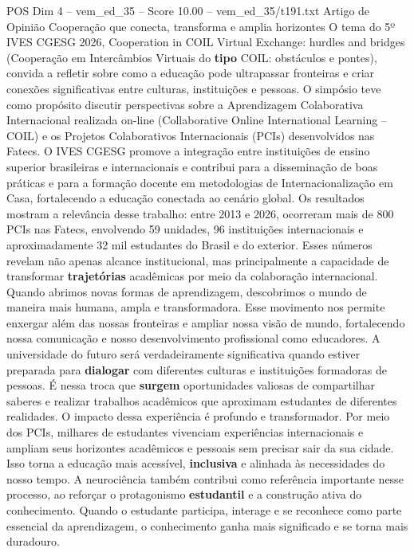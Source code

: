 \begin{textsample}{POS Dim 4 – vem\_ed\_35 – Score 10.00 – vem\_ed\_35/t191.txt}  \label{ex:f4_pos_004}
Artigo de Opinião Cooperação que conecta, transforma e amplia horizontes O tema do 5º IVES CGESG 2026, Cooperation in COIL Virtual Exchange: hurdles and bridges (Cooperação em Intercâmbios Virtuais do \textbf{tipo} COIL: obstáculos e pontes), convida a refletir sobre como a educação pode ultrapassar fronteiras e criar conexões significativas entre culturas, instituições e pessoas.
O simpósio teve como propósito discutir perspectivas sobre a Aprendizagem Colaborativa Internacional realizada on-line (Collaborative Online International Learning – COIL) e os Projetos Colaborativos Internacionais (PCIs) desenvolvidos nas Fatecs.
O IVES CGESG promove a integração entre instituições de ensino superior brasileiras e internacionais e contribui para a disseminação de boas práticas e para a formação docente em metodologias de Internacionalização em Casa, fortalecendo a educação conectada ao cenário global.
Os resultados mostram a relevância desse trabalho: entre 2013 e 2026, ocorreram mais de 800 PCIs nas Fatecs, envolvendo 59 unidades, 96 instituições internacionais e aproximadamente 32 mil estudantes do Brasil e do exterior.
Esses números revelam não apenas alcance institucional, mas principalmente a capacidade de transformar \textbf{trajetórias} acadêmicas por meio da colaboração internacional.
Quando abrimos novas formas de aprendizagem, descobrimos o mundo de maneira mais humana, ampla e transformadora.
Esse movimento nos permite enxergar além das nossas fronteiras e ampliar nossa visão de mundo, fortalecendo nossa comunicação e nosso desenvolvimento profissional como educadores.
A universidade do futuro será verdadeiramente significativa quando estiver preparada para \textbf{dialogar} com diferentes culturas e instituições formadoras de pessoas.
É nessa troca que \textbf{surgem} oportunidades valiosas de compartilhar saberes e realizar trabalhos acadêmicos que aproximam estudantes de diferentes realidades.
O impacto dessa experiência é profundo e transformador.
Por meio dos PCIs, milhares de estudantes vivenciam experiências internacionais e ampliam seus horizontes acadêmicos e pessoais sem precisar sair da sua cidade.
Isso torna a educação mais acessível, \textbf{inclusiva} e alinhada às necessidades do nosso tempo.
A neurociência também contribui como referência importante nesse processo, ao reforçar o protagonismo \textbf{estudantil} e a construção ativa do conhecimento.
Quando o estudante participa, interage e se reconhece como parte essencial da aprendizagem, o conhecimento ganha mais significado e se torna mais duradouro.

\end{textsample}
